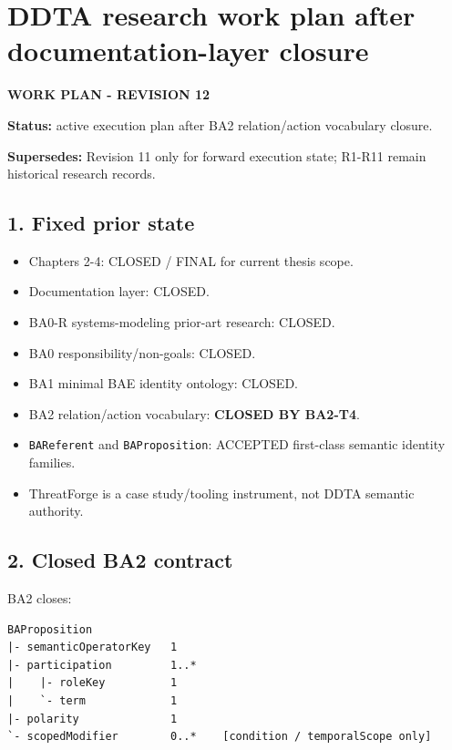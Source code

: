\documentclass[11pt,a4paper]{article}
\providecommand{\tightlist}{\setlength{\itemsep}{0pt}\setlength{\parskip}{0pt}}
\begin{document}
\section{DDTA research work plan after documentation-layer closure}\label{ddta-research-work-plan-after-documentation-layer-closure}

\textbf{WORK PLAN - REVISION 12}

\textbf{Status:} active execution plan after BA2 relation/action vocabulary closure.

\textbf{Supersedes:} Revision 11 only for forward execution state; R1-R11 remain historical research records.

\subsection{1. Fixed prior state}\label{fixed-prior-state}

\begin{itemize}
\tightlist
\item
  Chapters 2-4: CLOSED / FINAL for current thesis scope.
\item
  Documentation layer: CLOSED.
\item
  BA0-R systems-modeling prior-art research: CLOSED.
\item
  BA0 responsibility/non-goals: CLOSED.
\item
  BA1 minimal BAE identity ontology: CLOSED.
\item
  BA2 relation/action vocabulary: \textbf{CLOSED BY BA2-T4}.
\item
  \texttt{BAReferent} and \texttt{BAProposition}: ACCEPTED first-class semantic identity families.
\item
  ThreatForge is a case study/tooling instrument, not DDTA semantic authority.
\end{itemize}

\subsection{2. Closed BA2 contract}\label{closed-ba2-contract}

BA2 closes:

\begin{verbatim}
BAProposition
|- semanticOperatorKey   1
|- participation         1..*
|    |- roleKey          1
|    `- term             1
|- polarity              1
`- scopedModifier        0..*    [condition / temporalScope only]
\end{verbatim}
\end{document}
